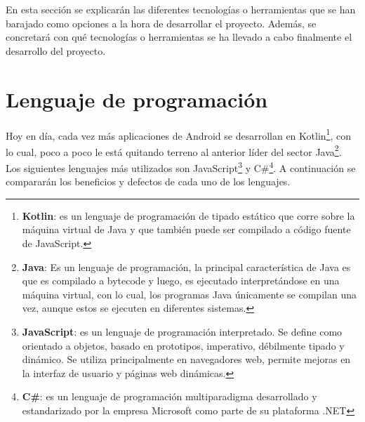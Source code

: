 En esta sección se explicarán las diferentes tecnologías o herramientas que se han barajado como opciones a la hora de desarrollar el proyecto. Además, se concretará con qué tecnologías o herramientas se ha llevado a cabo finalmente el desarrollo del proyecto.

\section{Lenguaje de programación}
Hoy en día, cada vez más aplicaciones de Android se desarrollan en Kotlin\footnote{\textbf{Kotlin}: es un lenguaje de programación de tipado estático que corre sobre la máquina virtual de Java y que también puede ser compilado a código fuente de JavaScript.}, con lo cual, poco a poco le está quitando terreno al anterior líder del sector Java\footnote{\textbf{Java}: Es un lenguaje de programación, la principal característica de Java es que es compilado a bytecode y luego, es ejecutado interpretándose en una máquina virtual, con lo cual, los programas Java únicamente se compilan una vez, aunque estos se ejecuten en diferentes sistemas.}\cite{kotlinPreferidoPorGoogle}. Los siguientes lenguajes más utilizados son JavaScript\footnote{\textbf{JavaScript}: es un lenguaje de programación interpretado. Se define como orientado a objetos, basado en prototipos, imperativo, débilmente tipado y dinámico. Se utiliza principalmente en navegadores web, permite mejoras en la interfaz de usuario y páginas web dinámicas.} y C\#\footnote{\textbf{C\#}: es un lenguaje de programación multiparadigma desarrollado y estandarizado por la empresa Microsoft como parte de su plataforma .NET}. A continuación se compararán los beneficios y defectos de cada uno de los lenguajes.

